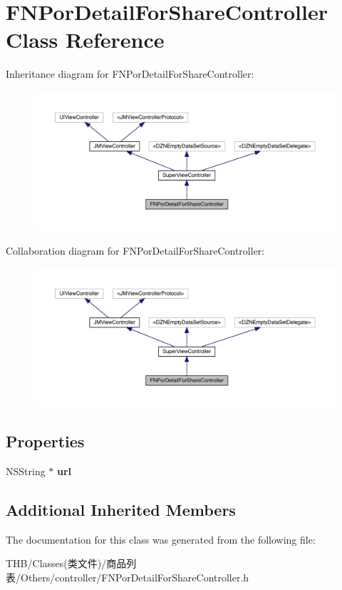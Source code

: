 \hypertarget{interface_f_n_por_detail_for_share_controller}{}\section{F\+N\+Por\+Detail\+For\+Share\+Controller Class Reference}
\label{interface_f_n_por_detail_for_share_controller}


Inheritance diagram for F\+N\+Por\+Detail\+For\+Share\+Controller\+:\nopagebreak
\begin{figure}[H]
\begin{center}
\leavevmode
\includegraphics[width=350pt]{interface_f_n_por_detail_for_share_controller__inherit__graph}
\end{center}
\end{figure}


Collaboration diagram for F\+N\+Por\+Detail\+For\+Share\+Controller\+:\nopagebreak
\begin{figure}[H]
\begin{center}
\leavevmode
\includegraphics[width=350pt]{interface_f_n_por_detail_for_share_controller__coll__graph}
\end{center}
\end{figure}
\subsection*{Properties}
\begin{DoxyCompactItemize}
\item 
\mbox{\label{interface_f_n_por_detail_for_share_controller_a7cbdc12a10ebe18e2e0d6b92cf45a03b}} 
N\+S\+String $\ast$ {\bfseries url}
\end{DoxyCompactItemize}
\subsection*{Additional Inherited Members}


The documentation for this class was generated from the following file\+:\begin{DoxyCompactItemize}
\item 
T\+H\+B/\+Classes(类文件)/商品列表/\+Others/controller/F\+N\+Por\+Detail\+For\+Share\+Controller.\+h\end{DoxyCompactItemize}
